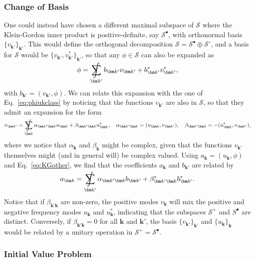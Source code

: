 \documentclass[letterpaper,12pt,titlepage,oneside,final]{book}
\renewcommand{\S}{\mathcal{S}}
\DeclareMathOperator*{\sumint}{%
\mathchoice%
  {\ooalign{$\displaystyle\sum$\cr\hidewidth$\displaystyle\int$\hidewidth\cr}}
  {\ooalign{\raisebox{.14\height}{\scalebox{.7}{$\textstyle\sum$}}\cr\hidewidth$\textstyle\int$\hidewidth\cr}}
  {\ooalign{\raisebox{.2\height}{\scalebox{.6}{$\scriptstyle\sum$}}\cr$\scriptstyle\int$\cr}}
  {\ooalign{\raisebox{.2\height}{\scalebox{.6}{$\scriptstyle\sum$}}\cr$\scriptstyle\int$\cr}}
}
\begin{document}
\subsubsection*{Change of Basis}

One could instead have chosen a different maximal subspace of $\S$ where the Klein-Gordon inner product is positive-definite, say $\S^\bullet$, with orthonormal basis $\{v_{\bm k'}\}_{\bm k'}$. This would define the orthogonal decomposition $\S = \S^\bullet\oplus\S^{\circ}$, and a basis for $\S$ would be $\{v_{\bm k'},v_{\bm k'}^*\}_{\bm k'}$, so that any $\phi \in \S$ can also be expanded as
\begin{equation}\label{eq:KGother}
    \phi = \sumint_{\bm k'} b_{\bm k'} v_{\bm k'}  + b_{\bm k'}^*v_{\bm k'}^*,
\end{equation}
with $b_{\bm k'} = (v_{\bm k'},\phi)$. We can relate this expansion with the one of Eq.~\eqref{eq:phiukclass} by noticing that the functions $v_{\bm k'}$ are also in $\S$, so that they admit an expansion for the form
\begin{equation}\label{eq:bogoliubov}
    v_{\bm k'} =  \sumint_{\bm k} \alpha_{\bm k' \bm k}u_{\bm k} + \beta_{\bm k' \bm k}u_{\bm k}^*, \quad \alpha_{\bm k'\bm k} = (u_{\bm k},v_{\bm k'}), \quad \beta_{\bm k'\bm k} = - (u_{\bm k}^*, v_{\bm k'}),
\end{equation}
where we notice that $\alpha_{\bm k}$ and $\beta_{\bm k}$ might be complex, given that the functions $v_{\bm k'}$ themselves might (and in general will) be complex valued. Using $a_{\bm k} = (u_{\bm k},\phi)$ and Eq.~\eqref{eq:KGother}, we find that the coefficients $a_{\bm k}$ and $b_{\bm k'}$ are related by
\begin{equation}
    a_{\bm k} = \sumint_{\bm k'} \alpha_{\bm k'\bm k} b_{\bm k'} + \beta_{\bm k'\bm k}^* b_{\bm k'}^*.
\end{equation}
Notice that if $\beta_{\bm k'\bm k}$ are non-zero, the positive modes $v_{\bm k}$ will mix the positive and negative frequency modes $u_{\bm k}$ and $u_{\bm k}^*$, indicating that the subspaces $\S^+$ and $S^\bullet$ are distinct. Conversely, if $\beta_{\bm k'\bm k} = 0$ for all $\bm k$ and $\bm k'$, the basis $\{v_{\bm k'}\}_{\bm k'}$ and $\{u_{\bm k}\}_{\bm k}$ would be related by a unitary operation in $\S^+ = \S^\bullet$.

\subsubsection*{Initial Value Problem}
\end{document}
